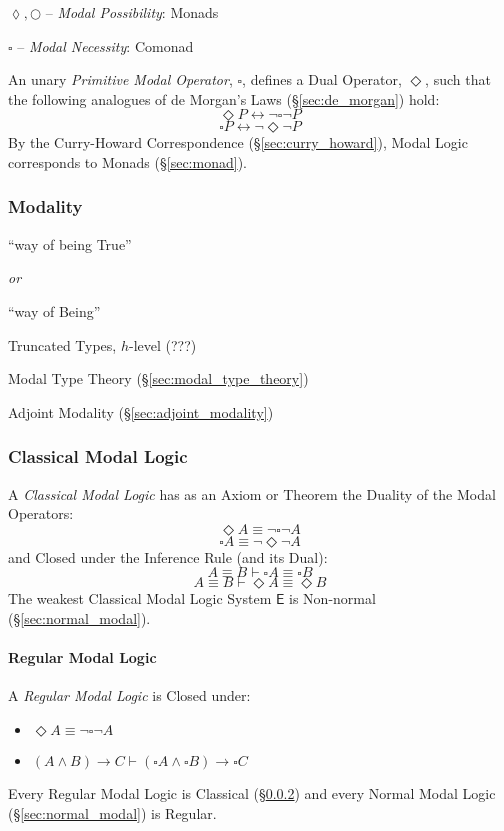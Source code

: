 $\lozenge, \bigcirc$ -- \emph{Modal Possibility}: Monads

$\square$ -- \emph{Modal Necessity}: Comonad


\asterism


An unary \emph{Primitive Modal Operator}, $\square$, defines a Dual
Operator, $\Diamond$, such that the following analogues of de Morgan's
Laws (\S\ref{sec:de_morgan}) hold:
\[
  \Diamond P \leftrightarrow \neg \square \neg P
\]
\[
  \square P \leftrightarrow \neg \Diamond \neg P
\]
By the Curry-Howard Correspondence (\S\ref{sec:curry_howard}), Modal
Logic corresponds to Monads (\S\ref{sec:monad}).



\subsubsection{Modality}\label{sec:modality}

``way of being True''

\emph{or}

``way of Being''

Truncated Types, $h$-level (???) %

Modal Type Theory (\S\ref{sec:modal_type_theory})

Adjoint Modality (\S\ref{sec:adjoint_modality})



\subsubsection{Classical Modal Logic}\label{sec:classical_modal}

A \emph{Classical Modal Logic} has as an Axiom or Theorem the Duality
of the Modal Operators:
\[
  \Diamond A \equiv \neg \square \neg A
\]\[
  \square A \equiv \neg \Diamond \neg A
\]
and Closed under the Inference Rule (and its Dual):
\[
  A \equiv B \vdash \square A \equiv \square B
\]\[
  A \equiv B \vdash \Diamond A \equiv \Diamond B
\]
The weakest Classical Modal Logic System $\mathsf{E}$ is Non-normal
(\S\ref{sec:normal_modal}).



\paragraph{Regular Modal Logic}\label{sec:regular_modal}\hfill

A \emph{Regular Modal Logic} is Closed under:
\begin {itemize}

\item $\Diamond A \equiv \neg \square \neg A$

\item $(A \wedge B) \rightarrow C \vdash
  (\square A \wedge \square B) \rightarrow \square C$

\end {itemize}
Every Regular Modal Logic is Classical (\S\ref{sec:classical_modal})
and every Normal Modal Logic (\S\ref{sec:normal_modal}) is Regular.



